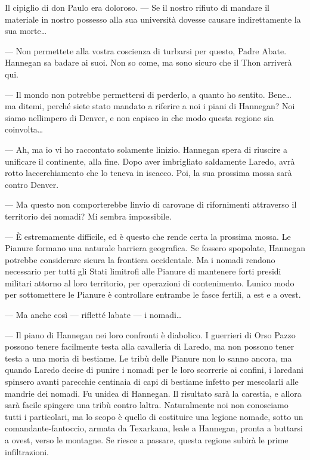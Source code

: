 Il cipiglio di don Paulo era doloroso. --- Se il nostro rifiuto di
mandare il materiale in nostro possesso alla sua università dovesse
causare indirettamente la sua morte\ldots{}

--- Non permettete alla vostra coscienza di turbarsi per questo, Padre
Abate. Hannegan sa badare ai suoi. Non so come, ma sono sicuro che il
Thon arriverà qui.

--- Il mondo non potrebbe permettersi di perderlo, a quanto ho sentito.
Bene\ldots{} ma ditemi, perché siete stato mandato a riferire a noi i
piani di Hannegan? Noi siamo nell\textquotesingle impero di Denver, e
non capisco in che modo questa regione sia coinvolta\ldots{}

--- Ah, ma io vi ho raccontato solamente l\textquotesingle inizio.
Hannegan spera di riuscire a unificare il continente, alla fine. Dopo
aver imbrigliato saldamente Laredo, avrà rotto
l\textquotesingle accerchiamento che lo teneva in iscacco. Poi, la sua
prossima mossa sarà contro Denver.

--- Ma questo non comporterebbe l\textquotesingle invio di carovane di
rifornimenti attraverso il territorio dei nomadi? Mi sembra impossibile.

--- È estremamente difficile, ed è questo che rende certa la prossima
mossa. Le Pianure formano una naturale barriera geografica. Se fossero
spopolate, Hannegan potrebbe considerare sicura la frontiera
occidentale. Ma i nomadi rendono necessario per tutti gli Stati
limitrofi alle Pianure di mantenere forti presidi militari attorno al
loro territorio, per operazioni di contenimento. L\textquotesingle unico
modo per sottomettere le Pianure è controllare entrambe le fasce
fertili, a est e a ovest.

--- Ma anche così --- rifletté l\textquotesingle abate --- i
nomadi\ldots{}

--- Il piano di Hannegan nei loro confronti è diabolico. I guerrieri di
Orso Pazzo possono tenere facilmente testa alla cavalleria di Laredo, ma
non possono tener testa a una moria di bestiame. Le tribù delle Pianure
non lo sanno ancora, ma quando Laredo decise di punire i nomadi per le
loro scorrerie ai confini, i laredani spinsero avanti parecchie
centinaia di capi di bestiame infetto per mescolarli alle mandrie dei
nomadi. Fu un\textquotesingle idea di Hannegan. Il risultato sarà la
carestia, e allora sarà facile spingere una tribù contro
l\textquotesingle altra. Naturalmente noi non conosciamo tutti i
particolari, ma lo scopo è quello di costituire una legione nomade,
sotto un comandante-fantoccio, armata da Texarkana, leale a Hannegan,
pronta a buttarsi a ovest, verso le montagne. Se riesce a passare,
questa regione subirà le prime infiltrazioni.

